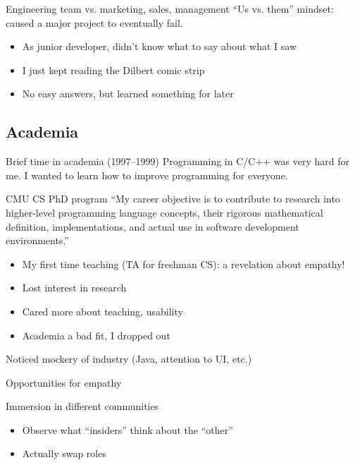 \begin{frame}{Engineering team vs. marketing, sales, management}
  ``Us vs. them'' mindset: caused a major project to eventually fail.

  \begin{itemize}
  \item As junior developer, didn't know what to say about what I saw
  \item I just kept reading the Dilbert comic strip
  \item No easy answers, but learned something for later
  \end{itemize}
\end{frame}

\subsection{Academia}

\begin{frame}{Brief time in academia (1997--1999)}
  Programming in C/C++ was very hard for me. I wanted to learn how to
  improve programming for everyone.

  \begin{block}{CMU CS PhD program}
    ``My career objective is to contribute to research into higher-level
    programming language concepts, their rigorous mathematical definition,
    implementations, and actual use in software development
    environments.''
  \end{block}

  \begin{itemize}
  \item My first time teaching (TA for freshman CS): a revelation
    about empathy!
  \item Lost interest in research
  \item Cared more about teaching, usability
  \item Academia a bad fit, I dropped out
  \end{itemize}

  Noticed mockery of industry (Java, attention to UI, etc.)
\end{frame}

\begin{frame}{Opportunities for empathy}
  \begin{alertblock}{Immersion in different communities}
    \begin{itemize}
    \item Observe what ``insiders'' think about the ``other''
    \item Actually swap roles
    \end{itemize}
  \end{alertblock}
\end{frame}

